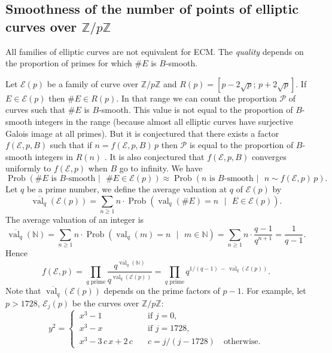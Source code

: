 \documentclass[a4paper, 11pt, pdftex]{report}
\theoremstyle{plain}
\theoremstyle{definition}
\DeclareMathOperator{\val}{val}
\DeclareMathOperator{\Prob}{Prob}
\begin{document}
\subsection{Smoothness of the number of points of elliptic curves over $\mathbb{Z}/p\mathbb{Z}$} \label{chap:smoothness}

All families of elliptic curves are not equivalent for ECM. The \textit{quality} depends on the
proportion of primes for which $\#E$ is $B$-smooth.

Let $\mathcal{E}(p)$ be a family of curve over $\mathbb{Z}/p\mathbb{Z}$ and
$R(p) = [p - 2\sqrt{p};\, p + 2\sqrt{p}]$. If $E \in \mathcal{E}(p)$ then $\#E \in R(p)$.
In that range we can count the proportion $\mathcal{P}$ of curves such that $\#E$ is $B$-smooth.
This value is not equal to the proportion of $B$-smooth integers in the range (because almost all
elliptic curves have surjective Galois image at all primes). But it is conjectured that there exists
a factor $f(\mathcal{E}, p, B)$ such that if $n = f(\mathcal{E}, p, B)\,p$ then $\mathcal{P}$
is equal to the proportion of $B$-smooth integers in $R(n)$ \cite[§ 5]{BarbulescuShinde1}.
It is also conjectured that $f(\mathcal{E}, p, B)$ converges uniformly to $f(\mathcal{E}, p)$
when $B$ go to infinity.
We have
$$\Prob(\#E \text{ is } B\text{-smooth } |\text{ } \#E \in \mathcal{E}(p)) \approx
 \Prob(n \text{ is } B\text{-smooth } |\text{ } n \sim f(\mathcal{E}, p)\,p).$$
Let $q$ be a prime number, we define the average valuation at $q$ of $\mathcal{E}(p)$ by
$$\overline{\val_q}(\mathcal{E}(p)) = \sum_{n \geq 1} n \cdot \Prob(\val_q(\#E) = n
 \text{ }|\text{ } E \in \mathcal{E}(p)).$$
The average valuation of an integer is
$$\overline{\val_q}(\mathbb{N})
 = \sum_{n \geq 1} n \cdot \Prob(\val_q(m) = n \text{ }|\text{ } m \in \mathbb{N})
 = \sum_{n \geq 1} n \cdot \frac{q - 1}{q^{n+1}} = \frac{1}{q - 1}.$$
Hence
$$f(\mathcal{E}, p) = \prod_{q\text{ prime}}
 \frac{q^{\overline{\val_q}(\mathbb{N})}}{q^{\overline{\val_q}(\mathcal{E}(p))}}
 = \prod_{q\text{ prime}} q^{1/(q - 1)\, -\, \overline{\val_q}(\mathcal{E}(p))}.$$
Note that $\overline{\val_q}(\mathcal{E}(p))$ depends on the prime factors of $p - 1$.
For example, let $p > 1728$, $\mathcal{E}_j(p)$ be the curves over $\mathbb{Z}/p\mathbb{Z}$:
\begin{equation*}
y^2 = \begin{cases}
\,x^3 - 1 &\quad \text{if } j = 0 \text{,}\\
\,x^3 - x &\quad \text{if } j = 1728 \text{,}\\
\,x^3 - 3\,c\,x + 2\,c &\quad c = j / (j - 1728)\quad \text{otherwise.}
\end{cases}
\end{equation*}
\end{document}
